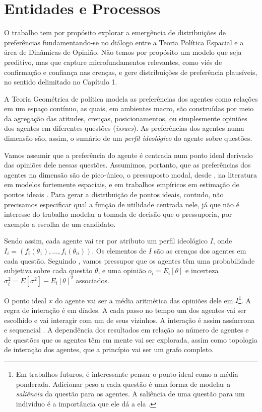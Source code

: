 
\section{Entidades e Processos}

O trabalho tem por propósito explorar a emergência de distribuições de
preferências fundamentando-se no diálogo entre a Teoria Política Espacial e a
área de Dinâmicas de Opinião. Não temos por propósito um modelo que seja
preditivo, mas que capture microfundamentos relevantes, como viés de confirmação
e confiança nas crenças, e gere distribuições de preferência plausíveis, no
sentido delimitado no Capítulo 1.

A Teoria Geométrica de política modela as preferências dos agentes como relações
em um espaço contínuo, as quais, em ambientes macro, são construídas por meio da
agregação das atitudes, crenças, posicionamentos, ou simplesmente opiniões dos
agentes em diferentes questões (\textit{issues}). As preferências dos agentes
numa dimensão são, assim, o sumário de um \textit{perfil ideológico} do agente
sobre questões.

Vamos assumir que a preferência do agente é centrada num ponto ideal derivado
das opiniões dele nessas questões. Assumimos, portanto, que as preferências dos
agentes na dimensão são de pico-único, o pressuposto modal, desde
, na literatura em modelos fortemente espaciais, e
em trabalhos empíricos em estimação de pontos ideais \cite{carroll2013structure,
  armstrong2014analyzing, schofield1998nash}. Para gerar a distribuição de
pontos ideais, contudo, não precisamos especificar qual a função de utilidade
centrada nele, já que não é interesse do trabalho modelar a tomada de decisão
que o pressuporia, por exemplo a escolha de um candidato.

Sendo assim, cada agente vai ter por atributo um perfil ideológico \(I\), onde
\(I_i = (f_i(\theta_1), \ldots, f_i(\theta_n)) \). Os elementos de \(I\) são as crenças dos
agentes em cada questão. Seguindo , vamos pressupor
que os agentes têm uma probabilidade subjetiva sobre cada questão \(\theta\), e uma
opinião \( o_i = E_i[\theta]\) e incerteza \( \sigma_i^2 = E[\sigma^2] - E_ i[\theta]^2\)
associados.

O ponto ideal \(x\) do agente vai ser a média aritmética das opiniões dele em
\(I\)\footnote{Em trabalhos futuros, é interessante pensar o ponto ideal como a
  média ponderada. Adicionar peso a cada questão é uma forma de modelar a
  \textit{saliência} da questão para os agentes. A saliência de uma questão para
  um indivíduo é a importância que ele dá a ela \cite{munger2015choosing}.}. A
regra de interação é em díades. A cada passo no tempo um dos agentes vai ser
escolhido e vai interagir com um de seus vizinhos. A interação é assim
assíncrona e sequencial
\cite{wilensky2015introduction}. A
dependência dos resultados em relação ao número de agentes e de questões que os
agentes têm em mente vai ser explorada, assim como topologia de interação dos
agentes, que a princípio vai ser um grafo completo.

